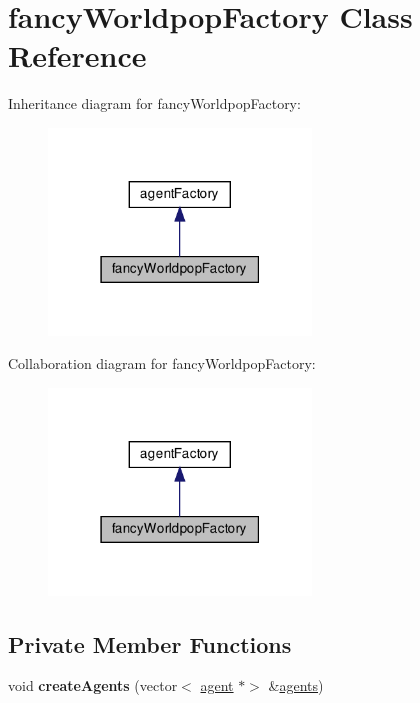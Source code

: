\hypertarget{classfancyWorldpopFactory}{}\section{fancy\+Worldpop\+Factory Class Reference}
\label{classfancyWorldpopFactory}


Inheritance diagram for fancy\+Worldpop\+Factory\+:
\nopagebreak
\begin{figure}[H]
\begin{center}
\leavevmode
\includegraphics[width=198pt]{classfancyWorldpopFactory__inherit__graph}
\end{center}
\end{figure}


Collaboration diagram for fancy\+Worldpop\+Factory\+:
\nopagebreak
\begin{figure}[H]
\begin{center}
\leavevmode
\includegraphics[width=198pt]{classfancyWorldpopFactory__coll__graph}
\end{center}
\end{figure}
\subsection*{Private Member Functions}
\begin{DoxyCompactItemize}
\item 
\mbox{\label{classfancyWorldpopFactory_a02ec5ffbb45ff8975f6e142dcd4520e3}} 
void {\bfseries create\+Agents} (vector$<$ \mbox{\hyperlink{classagent}{agent}} $\ast$$>$ \&\mbox{\hyperlink{classagents}{agents}})
\end{DoxyCompactItemize}
